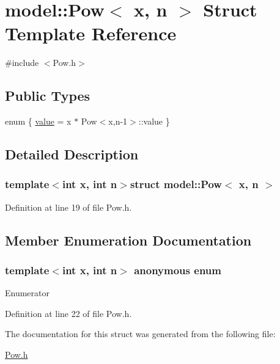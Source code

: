 \hypertarget{structmodel_1_1_pow}{}\section{model\+:\+:Pow$<$ x, n $>$ Struct Template Reference}
\label{structmodel_1_1_pow}


{\ttfamily \#include $<$Pow.\+h$>$}

\subsection*{Public Types}
\begin{DoxyCompactItemize}
\item 
enum \{ \hyperlink{structmodel_1_1_pow_a0268f3e8c7463aaf0f73430ec652c142adec817e3a941ddfa3b6813fb3e685bb9}{value} = x $\ast$ Pow$<$x,n-\/1$>$\+:\+:value
 \}
\end{DoxyCompactItemize}


\subsection{Detailed Description}
\subsubsection*{template$<$int x, int n$>$struct model\+::\+Pow$<$ x, n $>$}



Definition at line 19 of file Pow.\+h.



\subsection{Member Enumeration Documentation}
\hypertarget{structmodel_1_1_pow_a0268f3e8c7463aaf0f73430ec652c142}{}\subsubsection[{anonymous enum}]{\setlength{\rightskip}{0pt plus 5cm}template$<$int x, int n$>$ anonymous enum}\label{structmodel_1_1_pow_a0268f3e8c7463aaf0f73430ec652c142}
\begin{Desc}
\item[Enumerator]\par
\begin{description}
\item[{\em 
\hypertarget{structmodel_1_1_pow_a0268f3e8c7463aaf0f73430ec652c142adec817e3a941ddfa3b6813fb3e685bb9}{}value\label{structmodel_1_1_pow_a0268f3e8c7463aaf0f73430ec652c142adec817e3a941ddfa3b6813fb3e685bb9}
}]\end{description}
\end{Desc}


Definition at line 22 of file Pow.\+h.



The documentation for this struct was generated from the following file\+:\begin{DoxyCompactItemize}
\item 
\hyperlink{_pow_8h}{Pow.\+h}\end{DoxyCompactItemize}
